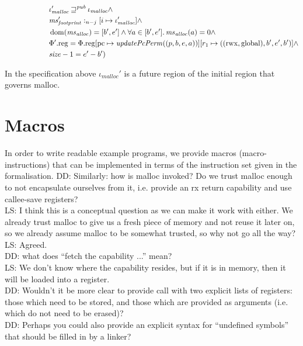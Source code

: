 \documentclass[a4paper]{article}
\newcommand{\update}[2]{[#1 \mapsto #2]}
\DeclareMathOperator{\dom}{dom}
\newcommand\lau[1]{{\color{purple} \sf \footnotesize {LS: #1}}\\}
\newcommand\dominique[1]{{\color{purple} \sf \footnotesize {DD: #1}}\\}
\newcommand{\var}[1]{\mathit{#1}}
\newcommand{\hs}{\var{ms}}
\newcommand{\ms}{\hs}
\newcommand{\pcreg}{\mathrm{pc}}
\newcommand{\heap}{\var{mem}}
\newcommand{\plainproj}[1]{\mathrm{#1}}
\newcommand{\memreg}[1][\Phi]{#1.\plainproj{reg}}
\newcommand{\plainfun}[2]{
  \ifthenelse{\equal{#2}{}}
  {\mathit{#1}}
  {\mathit{#1}(#2)}
}
\newcommand{\updatePcPerm}[1]{\plainfun{updatePcPerm}{#1}}
\newcommand{\futurewk}{\mathbin{\sqsupseteq}^{\var{pub}}}
\newcommand{\heapSat}[3][\heap]{#1 :_{#2} #3}
\newcommand{\codelabel}[1]{\mathit{#1}}
\newcommand{\malloc}{\codelabel{malloc}}
\newcommand{\plainperm}[1]{\mathrm{#1}}
\newcommand{\rwx}{\plainperm{rwx}}
\newcommand{\glob}{\plainperm{global}}
\begin{document}
\begin{specification}[Malloc v.2]
\[\begin{aligned}
                    &\qquad \qquad \qquad \iota_{\malloc}' \futurewk \iota_\malloc \land \\
                    &\qquad \qquad \qquad \heapSat[\ms_{\var{footprint}}']{n-j}{[i \mapsto \iota_\malloc']} \land \\
                    &\qquad \qquad \qquad \dom(\hs_{\var{alloc}}) = [b',e'] \land \forall a \in [b',e']\ldotp \hs_{\var{alloc}}(a) = 0  \land \\
                    &\qquad \qquad \qquad \memreg[\Phi'] = \memreg[\Phi]\update{\pcreg}{\updatePcPerm{(p,b,e,a)}}\update{r_1}{((\rwx,\glob),b',e',b')} \land \\
                    &\qquad \qquad \qquad \size - 1 = e'-b' )
                  \end{aligned}
                \]
              \end{specification}
              In the specification above $\iota_\malloc'$ is a future region of the initial region that governs malloc.

              \section{Macros}
              In order to write readable example programs, we provide macros (macro-instructions) that can be implemented in terms of the instruction set given in the formalisation.
              \dominique{Similarly: how is malloc invoked?  Do we trust malloc enough to not encapsulate ourselves from it, i.e. provide an rx return capability and use callee-save registers?}
              \lau{ I think this is a conceptual question as we can make it work with either. We already trust malloc to give us a fresh piece of memory and not reuse it later on, so we already assume malloc to be somewhat trusted, so why not go all the way? }
              \lau{Agreed.}

              \dominique{what does ``fetch the capability ...'' mean?}
              \lau{ We don't know where the capability resides, but if it is in memory, then it will be loaded into a register. }
              \dominique{Wouldn't it be more clear to provide call with two explicit lists of registers: those which need to be stored, and those which are provided as arguments (i.e. which do not need to be erased)?}
              \dominique{Perhaps you could also provide an explicit syntax for ``undefined symbols'' that should be filled in by a linker?}
\end{document}

